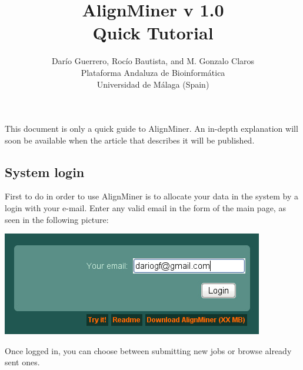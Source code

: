 \documentclass[12pt,oneside,a4paper,english]{article}  %
\title{\textbf{AlignMiner v 1.0}\\
		Quick Tutorial}
\author{Darío Guerrero, 
         Rocío Bautista, and 
         M. Gonzalo Claros \\
         Plataforma Andaluza de Bioinformática\\ Universidad de Málaga (Spain)
      }
\begin{document}
	


\maketitle




{\small This document is only a quick guide to AlignMiner. An in-depth explanation will soon be available when the article that describes it will be published}.





\subsection*{System login}

First to do in order to use AlignMiner is to allocate your data in the system by a login with your e-mail. Enter any valid email in the form of the main page, as seen in the following picture:

\begin{center}
		\includegraphics[width=.5\linewidth]{pics/login.jpg}
\end{center}

Once logged in, you can choose between submitting new jobs or browse already sent ones.
\end{document}
